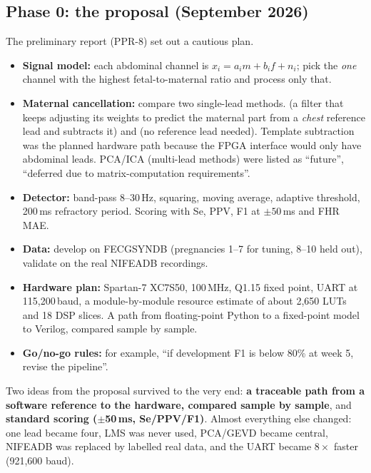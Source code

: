 \documentclass[11pt]{article}
\begin{document}
\subsection{Phase 0: the proposal (September 2026)}
\label{sec:proposal}
The preliminary report (PPR-8) set out a cautious plan.
\begin{itemize}
  \item \textbf{Signal model:} each abdominal channel is $x_i = a_i m + b_i f + n_i$; pick the \emph{one} channel with the highest fetal-to-maternal ratio and process only that.
  \item \textbf{Maternal cancellation:} compare two single-lead methods.  (a filter that keeps adjusting its weights to predict the maternal part from a \emph{chest} reference lead and subtracts it) and  (no reference lead needed). Template subtraction was the planned hardware path because the FPGA interface would only have abdominal leads. PCA/ICA (multi-lead methods) were listed as ``future'', ``deferred due to matrix-computation requirements''.
  \item \textbf{Detector:} band-pass 8--30\,Hz, squaring, moving average, adaptive threshold, 200\,ms refractory period. Scoring with Se, PPV, F1 at $\pm50$\,ms and FHR MAE.
  \item \textbf{Data:} develop on FECGSYNDB (pregnancies 1--7 for tuning, 8--10 held out), validate on the real NIFEADB recordings.
  \item \textbf{Hardware plan:} Spartan-7 XC7S50, 100\,MHz, Q1.15 fixed point, UART at 115,200\,baud, a module-by-module resource estimate of about 2,650 LUTs and 18 DSP slices. A path from floating-point Python to a fixed-point model to Verilog, compared sample by sample.
  \item \textbf{Go/no-go rules:} for example, ``if development F1 is below 80\% at week 5, revise the pipeline''.
\end{itemize}

\begin{lesson}
Two ideas from the proposal survived to the very end: \textbf{a traceable path from a software reference to the hardware, compared sample by sample}, and \textbf{standard scoring ($\pm$50\,ms, Se/PPV/F1)}. Almost everything else changed: one lead became four, LMS was never used, PCA/GEVD became central, NIFEADB was replaced by labelled real data, and the UART became $8\times$ faster (921,600 baud).
\end{lesson}
\end{document}
